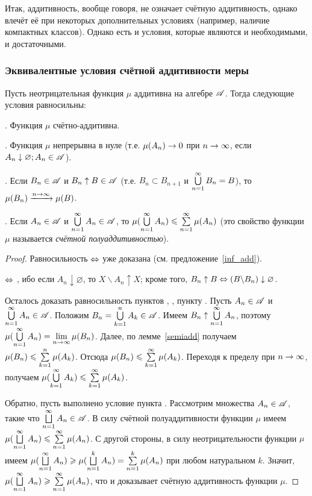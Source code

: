 \documentclass[10pt]{article}
\begin{document}
Итак, аддитивность, вообще говоря, не означает счётную аддитивность,
однако влечёт её при некоторых дополнительных условиях (например,
наличие компактных классов). Однако есть и условия, которые являются
и необходимыми, и достаточными.

\subsubsection{Эквивалентные условия счётной аддитивности меры}

\begin{prop}\label{count_add}
Пусть неотрицательная функция $\mu$ аддитивна на алгебре $\mathscr{A}$.
Тогда следующие условия равносильны:

. Функция $\mu$ счётно-аддитивна.

. Функция $\mu$ непрерывна в нуле (т.е. $\mu(A_n)\rightarrow0$ при
$n\rightarrow\infty$, если $A_n\downarrow\varnothing; A_n\in\mathscr{A}$).

. Если $B_n\in\mathscr{A}$ и $B_n\uparrow B\in\mathscr{A}$ (т.е. $B_n\subset
B_{n+1}$ и $\bigcup\limits_{n=1}^{\infty} B_n=B$), то $\mu(B_n)\xrightarrow{n\rightarrow\infty}\mu(B)$.

. Если $A_n\in\mathscr{A}$ и $\bigcup\limits_{n=1}^{\infty} A_n\in\mathscr{A}$, то $\mu(\bigcup\limits_{n=1}^{\infty}
A_n)\leqslant\sum\limits_{n=1}^{\infty}\mu(A_n)$ (это свойство функции $\mu$ называется
\emph{счётной полуаддитивностью}).
\end{prop}

\begin{proof}
Равносильность  $\Leftrightarrow$  уже доказана (см.
предложение~\ref{inf_add}).

 $\Leftrightarrow$ , ибо если $A_n\downarrow\varnothing$, то
$X\backslash A_n\uparrow X$; кроме того, $B_n\uparrow B\Leftrightarrow
(B\backslash B_n)\downarrow\varnothing$.

Осталось доказать равносильность пунктов , , 
пункту . Пусть $A_n\in\mathscr{A}$ и $\bigcup\limits_{n=1}^{\infty} A_n\in\mathscr{A}$. Положим
$B_n=\bigcup\limits_{k=1}^nA_k\in\mathscr{A}$. Имеем $B_n\uparrow\bigcup\limits_{n=1}^{\infty}
A_n$, поэтому $\mu(\bigcup\limits_{n=1}^{\infty} A_n)=\lim\limits_{n\rightarrow\infty}\mu(B_n)$.
Далее, по лемме~\ref{semiadd} получаем $\mu(B_n)\bw
\le\sum\limits_{k=1}^n\mu(A_k)$.
Отсюда $\mu(B_n)\leqslant\sum\limits_{k=1}^{\infty}\mu(A_k)$. Переходя к пределу при
$n\rightarrow\infty$, получаем $\mu(\cupkui A_k)\bw\le\sumkui\mu(A_k)$.

Обратно, пусть выполнено условие пункта . Рассмотрим множества
$A_n\in\mathscr{A}$, такие что $\bigsqcup\limits_{n=1}^\infty A_n\in\mathscr{A}$. В
силу счётной полуаддитивности функции $\mu$ имеем
$\mu(\bigsqcup\limits_{n=1}^\infty A_n)\leqslant\sum\limits_{n=1}^{\infty}\mu(A_n)$. С другой
стороны, в силу неотрицательности функции $\mu$ имеем
$\mu(\bigsqcup\limits_{n=1}^\infty A_n)\bw
\ge\mu(\bigsqcup\limits_{n=1}^k A_n)
\bw=\sum\limits_{n=1}^k\mu(A_n)$ при любом натуральном $k$. Значит,
$\mu(\bigsqcup\limits_{n=1}^\infty A_n)\bw\ge\sumnui\mu(A_n)$, что и
доказывает счётную аддитивность функции $\mu$.
\end{proof}
\end{document}
